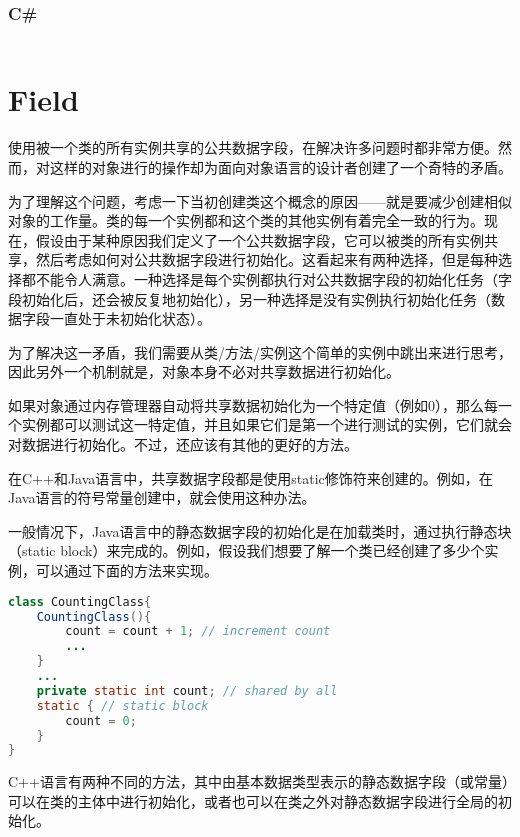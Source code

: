 \subsection{C\#}



\begin{lstlisting}[language=C++]

\end{lstlisting}


\chapter{Field}

使用被一个类的所有实例共享的公共数据字段，在解决许多问题时都非常方便。然而，对这样的对象进行的操作却为面向对象语言的设计者创建了一个奇特的矛盾。

为了理解这个问题，考虑一下当初创建类这个概念的原因——就是要减少创建相似对象的工作量。类的每一个实例都和这个类的其他实例有着完全一致的行为。现在，假设由于某种原因我们定义了一个公共数据字段，它可以被类的所有实例共享，然后考虑如何对公共数据字段进行初始化。这看起来有两种选择，但是每种选择都不能令人满意。一种选择是每个实例都执行对公共数据字段的初始化任务（字段初始化后，还会被反复地初始化），另一种选择是没有实例执行初始化任务（数据字段一直处于未初始化状态）。

为了解决这一矛盾，我们需要从类/方法/实例这个简单的实例中跳出来进行思考，因此另外一个机制就是，对象本身不必对共享数据进行初始化。

如果对象通过内存管理器自动将共享数据初始化为一个特定值（例如0），那么每一个实例都可以测试这一特定值，并且如果它们是第一个进行测试的实例，它们就会对数据进行初始化。不过，还应该有其他的更好的方法。

在C++和Java语言中，共享数据字段都是使用static修饰符来创建的。例如，在Java语言的符号常量创建中，就会使用这种办法。

一般情况下，Java语言中的静态数据字段的初始化是在加载类时，通过执行静态块（static block）来完成的。例如，假设我们想要了解一个类已经创建了多少个实例，可以通过下面的方法来实现。

\begin{lstlisting}[language=Java]
class CountingClass{
	CountingClass(){
		count = count + 1; // increment count
		...
	}
	...
	private static int count; // shared by all
	static { // static block
		count = 0;
	}
}
\end{lstlisting}

C++语言有两种不同的方法，其中由基本数据类型表示的静态数据字段（或常量）可以在类的主体中进行初始化，或者也可以在类之外对静态数据字段进行全局的初始化。



